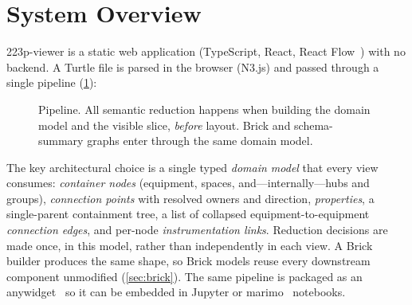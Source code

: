 \documentclass[10pt,twocolumn]{article}
\begin{document}
\section{System Overview}
\label{sec:overview}

223p-viewer is a static web application (TypeScript, React, React
Flow~\cite{reactflow}) with no backend. A Turtle file is parsed in the browser
(N3.js) and passed through a single pipeline (\cref{fig:pipeline}):

\begin{figure}[t]
\centering
{}
\caption{Pipeline. All semantic reduction happens when building the domain
model and the visible slice, \emph{before} layout. Brick and schema-summary
graphs enter through the same domain model.}
\label{fig:pipeline}
\end{figure}

The key architectural choice is a single typed \emph{domain model} that every
view consumes: \emph{container nodes} (equipment, spaces, and---internally---hubs and
groups), \emph{connection points} with resolved owners and direction,
\emph{properties}, a single-parent containment tree, a list of collapsed
equipment-to-equipment \emph{connection edges}, and per-node
\emph{instrumentation links}. Reduction decisions are made once, in this model,
rather than independently in each view. A Brick builder produces the same shape,
so Brick models reuse every downstream component unmodified
(\cref{sec:brick}). The same pipeline is packaged as an
anywidget~\cite{anywidget} so it can be embedded in Jupyter or
marimo~\cite{marimo} notebooks.
\end{document}
